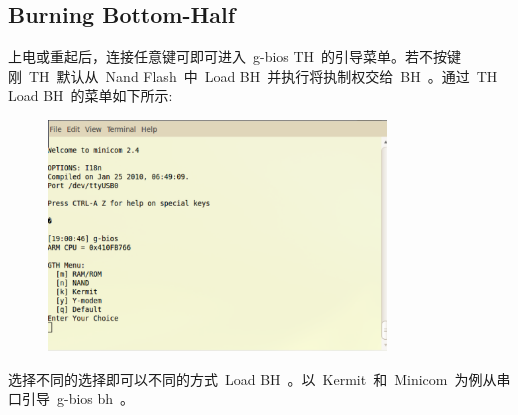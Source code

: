 \documentclass[a4paper,11pt]{book}
\begin{document}
\subsection{Burning Bottom-Half}
上电或重起后，连接任意键可即可进入~g-bios TH~的引导菜单。若不按键刚~TH~默认从~Nand Flash~中~Load BH~并执行将执制权交给~BH~。通过~TH Load BH~的菜单如下所示:
\begin{figure}[H]
\centering
\includegraphics[width=0.8\textwidth]{image/min_01.eps}
\end{figure}
选择不同的选择即可以不同的方式~Load BH~。以~Kermit~和~Minicom~为例从串口引导~g-bios bh~。
\end{document}
